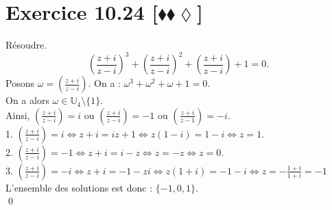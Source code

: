 \documentclass[10pt]{article}
\begin{document}
\section*{Exercice 10.24 [$\blacklozenge\blacklozenge\lozenge$]}
\begin{tcolorbox}[enhanced, width=7in, center, size=fbox, fontupper=\large, drop shadow southwest]
    Résoudre.
    \begin{equation*}
        \left( \frac{z+i}{z-i} \right)^3 + \left( \frac{z+i}{z-i} \right)^2 + \left( \frac{z+i}{z-i} \right) + 1 = 0.
    \end{equation*}
    Posons $\omega=\left( \frac{z+i}{z-i} \right)$. On a : $\omega^3 + \omega^2 + \omega + 1 = 0$.\\
    On a alors $\omega\in\mathbb{U}_4 \setminus \{1\}$.\\
    Ainsi, $\left( \frac{z+i}{z-i} \right)=i$ ou $\left( \frac{z+i}{z-i} \right) = -1$ ou $\left( \frac{z+i}{z-1} \right) = -i$.\\
    1. $\left( \frac{z+i}{z-i} \right)=i\iff z+i = iz+1 \iff z(1 - i) = 1 - i \iff z = 1$.\\
    2. $\left( \frac{z+i}{z-i} \right)=-1 \iff z+i = i - z \iff z = -z \iff z = 0$.\\
    3. $\left( \frac{z+i}{z-i} \right)=-i \iff z+i = -1 - zi \iff z(1+i) = -1 - i \iff z=-\frac{1+i}{1+i}=-1$\\
    L'ensemble des solutions est donc : $\{-1, 0, 1\}$.\\
    \qed
\end{tcolorbox}
\end{document}
